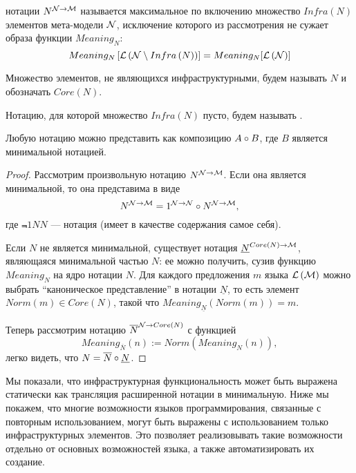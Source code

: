\newcommand{\Infra}[1]{Infra\left(#1\right)}
\newcommand{\Core}[1]{Core\left(#1\right)}

\begin{Def}
 нотации $N^{{\mathcal{N}} \rightarrow{} {\mathcal{M}}}$ называется максимальное по включению множество $\Infra{N}$ элементов мета-модели $\mathcal{N}$, исключение которого из рассмотрения не сужает образа функции $Meaning_N$:
	$$
		Meaning_N\left[
			\Lang{\MM{N} \setminus \Infra{N}}\right] = Meaning_N[\LMM{N}]
	$$
	
Множество элементов, не являющихся инфраструктурными, будем называть  $N$ и обозначать $\Core{N}$.
\end{Def}

\begin{Def}
	Нотацию, для которой множество $\Infra{N}$ пусто, будем называть .
\end{Def}

\begin{Prop}
	Любую нотацию можно представить как композицию $A \circ B$, где $B$ является минимальной нотацией.
\end{Prop}
\begin{proof}
Рассмотрим произвольную нотацию $N^{{\mathcal{N}} \rightarrow{} {\mathcal{M}}}$. Если она является минимальной, то она представима в виде
	$$N^{{\mathcal{N}} \rightarrow{} {\mathcal{M}}} = 1^{{\mathcal{N}} \rightarrow{} {\mathcal{N}}} \circ N^{{\mathcal{N}} \rightarrow{} {\mathcal{M}}},$$
где $\Not{1}{N}{N}$ ---  нотация (имеет в качестве содержания самое себя).

Если $N$ не является минимальной, существует нотация $\NNot{\underline{N}}{\Core{N}}{\MM{M}}$, являющаяся минимальной частью $N$: ее можно получить, сузив функцию $Meaning_N$ на ядро нотации $N$. Для каждого предложения $m$ языка $\mathcal{L}\left(\mathcal{M}\right)$ можно выбрать ``каноническое представление'' в нотации $\underline{N}$, то есть элемент $Norm(m) \in \Core{N}$, такой что $Meaning_{\underline{N}}(Norm(m)) = m$.

Теперь рассмотрим нотацию $\NNot{\overline{N}}{\MM{N}}{\Core{N}}$ с функцией
	$$Meaning_{\overline{N}}(n) := Norm(Meaning_N(n)),$$
легко видеть, что $N = \overline{N} \circ \underline{N}$.
\end{proof}

Мы показали, что инфраструктурная функциональность может быть выражена статически как трансляция расширенной нотации в минимальную.  Ниже мы покажем, что многие возможности языков программирования, связанные с повторным использованием, могут быть выражены с использованием только инфраструктурных элементов. Это позволяет реализовывать такие возможности отдельно от основных возможностей языка, а также автоматизировать их создание.


